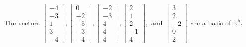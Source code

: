 \begin{exercise}
\begin{exerciseStatement}
  \end{exerciseStatement}
  \begin{exerciseAnswer}
   The vectors \(\left[\begin{array}{r}
-4 \\
-3 \\
1 \\
3 \\
-4
\end{array}\right] , \left[\begin{array}{r}
0 \\
-2 \\
-5 \\
-3 \\
-4
\end{array}\right] , \left[\begin{array}{r}
-2 \\
-3 \\
4 \\
4 \\
4
\end{array}\right] , \left[\begin{array}{r}
2 \\
1 \\
2 \\
-1 \\
4
\end{array}\right] , \text{ and } \left[\begin{array}{r}
3 \\
2 \\
-2 \\
0 \\
2
\end{array}\right]\) 
  	 are  a basis of \(\mathbb{R}^5\).
  


  \end{exerciseAnswer}
\end{exercise}